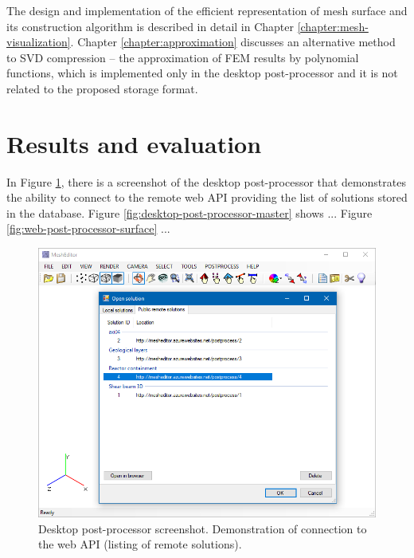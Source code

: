 The design and implementation of the efficient representation of mesh surface and its construction algorithm is described in detail in Chapter \ref{chapter:mesh-visualization}. Chapter \ref{chapter:approximation} discusses an alternative method to SVD compression -- the approximation of FEM results by polynomial functions, which is implemented only in the desktop post-processor and it is not related to the proposed storage format.



\pagebreak

\section{Results and evaluation}


In Figure \ref{fig:desktop-post-processor-remote-solutions}, there is a screenshot of the desktop post-processor that demonstrates the ability to connect to the remote web API providing the list of solutions stored in the database.
Figure \ref{fig:desktop-post-processor-master} shows ... 
Figure \ref{fig:web-post-processor-surface} ...

\begin{figure}[H]
    \centering
    \includegraphics[width=\textwidth]{figures/chapter-data-management/desktop-post-processor-remote-solutions}
    \decoRule
    \caption[Desktop post-processor screenshot. List of remote solutions.]{Desktop post-processor screenshot. Demonstration of connection to the web API (listing of remote solutions).}
    \label{fig:desktop-post-processor-remote-solutions}
\end{figure}

